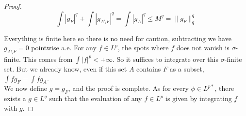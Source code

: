 \documentclass[../../main.tex]{subfiles}
\begin{document}
\begin{proof}
\[
\int |g_F|^q + \int |g_{A\setminus F}|^q = \int |g_A|^q \leq M^q = \lVert g_F \rVert^q_q
\]

Everything is finite here so there is no need for caution, subtracting we have $g_{A\setminus F} = 0$ pointwise a.e. For any $f\in L^p$, the spots where $f$ does not vanish is $\sigma$-finite. This comes from $\int |f|^p < +\infty$. So it suffices to integrate over this $\sigma$-finite set. But we already know, even if this set $A$ contains $F$ as a subset,  $\int fg_{F} = \int fg_{A}$.\\

We now define $g = g_F$, and the proof is complete. As for every $\phi\in L^{p*}$, there exists a $g\in L^q$ such that the evaluation of any $f\in L^p$ is given by integrating $f$ with $g$.
\end{proof}
\end{document}
